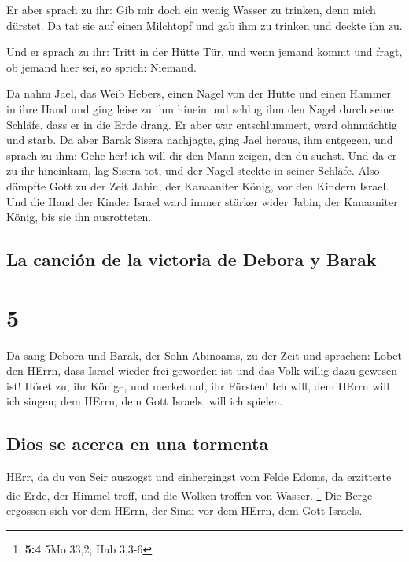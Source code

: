  Er aber sprach zu ihr: Gib mir doch ein wenig Wasser zu
trinken, denn mich dürstet. Da tat sie auf einen Milchtopf und gab ihm
zu trinken und deckte ihn zu.

 Und er sprach zu ihr: Tritt in der Hütte Tür, und wenn
jemand kommt und fragt, ob jemand hier sei, so sprich: Niemand.

 Da nahm Jael, das Weib Hebers, einen Nagel von der Hütte
und einen Hammer in ihre Hand und ging leise zu ihm hinein und schlug
ihm den Nagel durch seine Schläfe, dass er in die Erde drang. Er aber
war entschlummert, ward ohnmächtig und starb.  Da aber
Barak Sisera nachjagte, ging Jael heraus, ihm entgegen, und sprach zu
ihm: Gehe her! ich will dir den Mann zeigen, den du suchst. Und da er zu
ihr hineinkam, lag Sisera tot, und der Nagel steckte in seiner Schläfe.
 Also dämpfte Gott zu der Zeit Jabin, der Kanaaniter
König, vor den Kindern Israel.  Und die Hand der Kinder
Israel ward immer stärker wider Jabin, der Kanaaniter König, bis sie ihn
ausrotteten.

\hypertarget{la-canciuxf3n-de-la-victoria-de-debora-y-barak}{%
\subsection{La canción de la victoria de Debora y
Barak}\label{la-canciuxf3n-de-la-victoria-de-debora-y-barak}}

\hypertarget{section-4}{%
\section{5}\label{section-4}}

 Da sang Debora und Barak, der Sohn Abinoams, zu der Zeit
und sprachen:  Lobet den HErrn, dass Israel wieder frei
geworden ist und das Volk willig dazu gewesen ist!  Höret
zu, ihr Könige, und merket auf, ihr Fürsten! Ich will, dem HErrn will
ich singen; dem HErrn, dem Gott Israels, will ich spielen.

\hypertarget{dios-se-acerca-en-una-tormenta}{%
\subsection{Dios se acerca en una
tormenta}\label{dios-se-acerca-en-una-tormenta}}

 HErr, da du von Seir auszogst und einhergingst vom Felde
Edoms, da erzitterte die Erde, der Himmel troff, und die Wolken troffen
von Wasser. \footnote{\textbf{5:4} 5Mo 33,2; Hab 3,3-6} 
Die Berge ergossen sich vor dem HErrn, der Sinai vor dem HErrn, dem Gott
Israels.

